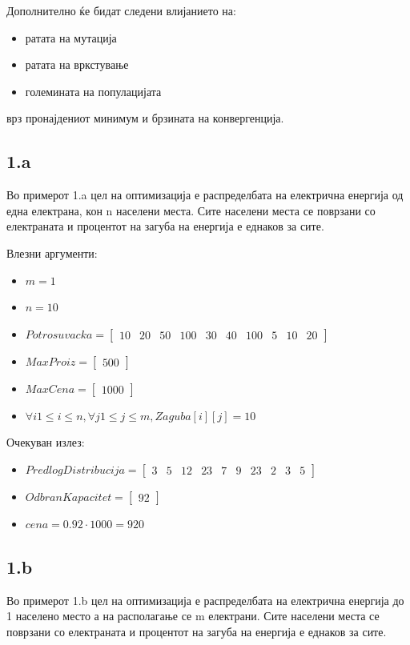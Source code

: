\documentclass{article}
\begin{document}
Дополнително ќе бидат следени влијанието на:
\begin{itemize}
\item ратата на мутација
\item ратата на вркстување
\item големината на популацијата
\end{itemize}

врз пронајдениот минимум и брзината на конвергенција.

\subsection{1.a}
Во примерот 1.a цел на оптимизација е распределбата на електрична енергија од една електрана, кон n населени места. Сите населени места се поврзани со електраната и процентот на загуба на енергија е еднаков за сите.

Влезни аргументи: 
\begin{itemize}
\item $m = 1$
\item $n = 10$
\item $Potrosuvacka = \begin{bmatrix} 10 & 20 & 50 & 100 & 30 & 40 & 100 & 5 & 10 & 20\end{bmatrix}$
\item $MaxProiz = \begin{bmatrix} 500 \end{bmatrix}$
\item $MaxCena = \begin{bmatrix} 1000 \end{bmatrix}$
\item $\forall i 1 \leq i \leq n, \forall j 1 \leq j \leq m, Zaguba[i][j] = 10$

\end{itemize}

Очекуван излез:
\begin{itemize}
\item $PredlogDistribucija = \begin{bmatrix} 3 & 5 & 12 & 23 & 7 & 9 & 23 & 2 & 3 & 5\end{bmatrix}$
\item $ OdbranKapacitet = \begin{bmatrix} 92 \end{bmatrix}$
\item $cena = 0.92 \cdot 1000 = 920 $
\end{itemize}

\subsection{1.b}
Во примерот 1.b цел на оптимизација е распределбата на електрична енергија до 1 населено место а на располагање се m електрани. Сите населени места се поврзани со електраната и процентот на загуба на енергија е еднаков за сите.
\end{document}
